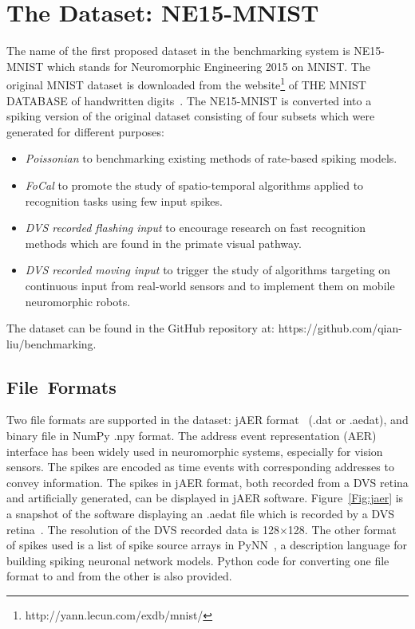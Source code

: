 \section{The Dataset: NE15-MNIST}
\label{sec:data}
The name of the first proposed dataset in the benchmarking system is NE15-MNIST which stands for Neuromorphic Engineering 2015 on MNIST.
The original MNIST dataset is downloaded from the website\footnote{http://yann.lecun.com/exdb/mnist/} of THE MNIST DATABASE of handwritten digits~\citep{lecun1998gradient}.
The NE15-MNIST is converted into a spiking version of the original dataset consisting of four subsets which were generated for different purposes:
\begin{itemize}
	\item \textit{Poissonian}
	to benchmarking existing methods of rate-based spiking models.
	\item \textit{FoCal}
	to promote the study of spatio-temporal algorithms applied to recognition tasks using few input spikes.
	\item \textit{DVS recorded flashing input}
	to encourage research on fast recognition methods which are found in the primate visual pathway.
	\item \textit{DVS recorded moving input}
	to trigger the study of algorithms targeting on continuous input from real-world sensors and to implement them on mobile neuromorphic robots.
\end{itemize}
The dataset can be found in the GitHub repository at: https://github.com/qian-liu/benchmarking.
\subsection{File~Formats}
	
Two file formats are supported in the dataset: jAER format~\citep{delbruck2008frame} (.dat or .aedat), and binary file in NumPy .npy format.
The  address event representation (AER) interface has been widely used in neuromorphic systems, especially for vision sensors.
The spikes are encoded as time events with corresponding addresses to convey information.
The spikes in jAER format, both recorded from a DVS retina and artificially generated, can be displayed in jAER software.
Figure~\ref{Fig:jaer} is a snapshot of the software displaying an .aedat file which is recorded by a DVS retina~\citep{serrano2013128}.
The resolution of the DVS recorded data is 128$\times$128.
The other format of spikes used is a list of spike source arrays in PyNN~\citep{davison2008pynn}, a description language for building spiking neuronal network models.
Python code for converting one file format to and from the other is also provided.

